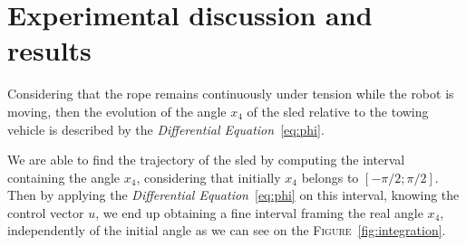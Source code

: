 \section{Experimental discussion and results}
    Considering that the rope remains continuously under tension while the robot is moving, then the evolution of the angle $x_4$ of the sled relative to the towing vehicle is described by the \textit{Differential Equation}~\ref{eq:phi}.

    We are able to find the trajectory of the sled by computing the interval containing the angle $x_4$, considering that initially $x_4$ belongs to $[-\pi/2; \pi/2]$. Then by applying the \textit{Differential Equation}~\ref{eq:phi} on this interval, knowing the control vector $u$, we end up obtaining a fine interval framing the real angle $x_4$, independently of the initial angle as we can see on the \textsc{Figure}~\ref{fig:integration}.

    